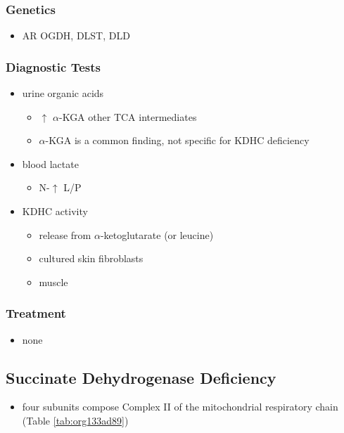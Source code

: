 \documentclass[12pt]{scrartcl}
\begin{document}
\subsubsection{Genetics}
\label{sec:org4d5691c}
\begin{itemize}
\item AR OGDH, DLST, DLD
\end{itemize}

\subsubsection{Diagnostic Tests}
\label{sec:orgbd9e87a}
\begin{itemize}
\item urine organic acids
\begin{itemize}
\item \(\uparrow\) \(\alpha\)-KGA \textpm{} other TCA intermediates
\item \(\alpha\)-KGA is a common finding, not specific for KDHC deficiency
\end{itemize}
\item blood lactate
\begin{itemize}
\item N-\(\uparrow\) L/P
\end{itemize}
\item KDHC activity
\begin{itemize}
\item {} release from \ce{[1-^14C]} \(\alpha\)-ketoglutarate (or \ce{[1-^14C]} leucine)
\item cultured skin fibroblasts
\item muscle
\end{itemize}
\end{itemize}

\subsubsection{Treatment}
\label{sec:org24f50d5}
\begin{itemize}
\item none
\end{itemize}
\subsection{Succinate Dehydrogenase Deficiency}
\label{sec:org774d382}
\begin{itemize}
\item four subunits compose Complex II of the mitochondrial respiratory
chain (Table \ref{tab:org133ad89})
\end{itemize}
\end{document}
